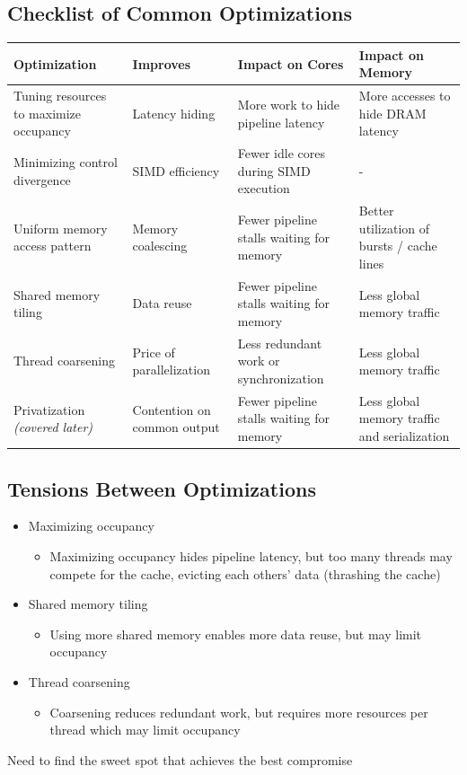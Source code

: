 \documentclass{article}
\begin{document}
\subsection{Checklist of Common Optimizations}

{
\setlength{\tabcolsep}{3pt}
\setlength{\extrarowheight}{2pt}
\begin{longtable}{>{\raggedright\arraybackslash}p{}>{\raggedright\arraybackslash}p{}>{\raggedright\arraybackslash}p{}>{\raggedright\arraybackslash}p{}}
\hline
\textbf{Optimization} & \textbf{Improves} & \textbf{Impact on Cores} & \textbf{Impact on Memory} \\ \hline
Tuning resources to maximize occupancy & Latency hiding & More work to hide pipeline latency & More accesses to hide DRAM latency \\ \hline
Minimizing control divergence & SIMD efficiency & Fewer idle cores during SIMD execution & - \\ \hline
Uniform memory access pattern & Memory coalescing & Fewer pipeline stalls waiting for memory & Better utilization of bursts / cache lines \\ \hline
Shared memory tiling & Data reuse & Fewer pipeline stalls waiting for memory & Less global memory traffic \\ \hline
Thread coarsening & Price of parallelization & Less redundant work or synchronization & Less global memory traffic \\ \hline
Privatization \textit{(covered later)} & Contention on common output & Fewer pipeline stalls waiting for memory & Less global memory traffic and serialization \\ \hline
\end{longtable}
}


\subsection{Tensions Between Optimizations}

\begin{itemize}
\item Maximizing occupancy
\begin{itemize}
\item Maximizing occupancy hides pipeline latency, but too many threads may compete for the cache, evicting each others' data (thrashing the cache)
\end{itemize}
\item Shared memory tiling
\begin{itemize}
\item Using more shared memory enables more data reuse, but may limit occupancy
\end{itemize}
\item Thread coarsening
\begin{itemize}
\item Coarsening reduces redundant work, but requires more resources per thread which may limit occupancy

\end{itemize}
\end{itemize}
Need to find the sweet spot that achieves the best compromise
\end{document}
